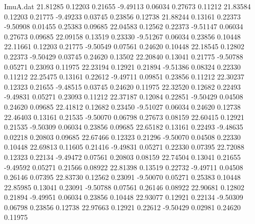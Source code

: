 \begin{filecontents}{ImuA.dat}
  21.81285    0.12203    0.21655   -9.49113    0.06034    0.27673    0.11212
  21.83584    0.12203    0.21775   -9.49233    0.03745    0.23856    0.12738
  21.88244    0.13161    0.22373   -9.50908    0.01455    0.25383    0.09685
  22.04583    0.12562    0.22373   -9.51147    0.06034    0.27673    0.09685
  22.09158    0.13519    0.23330   -9.51267    0.06034    0.23856    0.10448
  22.11661    0.12203    0.21775   -9.50549    0.07561    0.24620    0.10448
  22.18545    0.12802    0.22373   -9.50429    0.03745    0.24620    0.13502
  22.20840    0.13041    0.21775   -9.50788    0.05271    0.23093    0.11975
  22.23194    0.12921    0.21894   -9.51386    0.08324    0.22330    0.11212
  22.25475    0.13161    0.22612   -9.49711    0.09851    0.23856    0.11212
  22.30237    0.12323    0.21655   -9.48515    0.03745    0.24620    0.11975
  22.32520    0.12682    0.22493   -9.49831    0.05271    0.23093    0.11212
  22.37187    0.12084    0.22851   -9.50429    0.04508    0.24620    0.09685
  22.41812    0.12682    0.23450   -9.51027    0.06034    0.24620    0.12738
  22.46403    0.13161    0.21535   -9.50070    0.06798    0.27673    0.08159
  22.60415    0.12921    0.21535   -9.50309    0.06034    0.23856    0.09685
  22.65182    0.13161    0.22493   -9.48635    0.02218    0.20803    0.09685
  22.67466    0.12323    0.21296   -9.50070    0.04508    0.22330    0.10448
  22.69813    0.11605    0.21416   -9.49831    0.05271    0.22330    0.07395
  22.72088    0.12323    0.22134   -9.49472    0.07561    0.20803    0.08159
  22.74504    0.13041    0.21655   -9.49592    0.05271    0.21566    0.08922
  22.81398    0.13519    0.22732   -9.49711    0.04508    0.26146    0.07395
  22.83730    0.12562    0.23091   -9.50070    0.05271    0.25383    0.10448
  22.85985    0.13041    0.23091   -9.50788    0.07561    0.26146    0.08922
  22.90681    0.12802    0.21894   -9.49951    0.06034    0.23856    0.10448
  22.93077    0.12921    0.22134   -9.50309    0.06798    0.23856    0.12738
  22.97663    0.12921    0.22612   -9.50429    0.02981    0.24620    0.11975
\end{filecontents}
